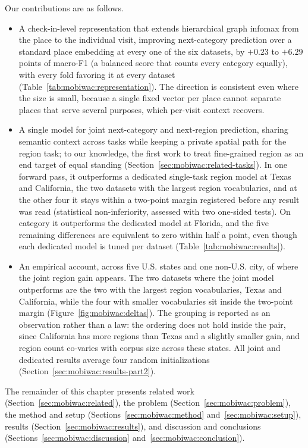 Our contributions are as follows.
\begin{itemize}
  \item A check-in-level representation that extends hierarchical graph infomax from the place to the individual visit, improving next-category prediction over a standard place embedding at every one of the six datasets, by $+0.23$ to $+6.29$ points of macro-F1 (a balanced score that counts every
    category equally), with every fold favoring it at every dataset (Table~\ref{tab:mobiwac:representation}). The direction is
    consistent even where the size is small, because a single fixed vector
    per place cannot separate places that serve several purposes, which
    per-visit context recovers.
  \item A single model for joint next-category and next-region prediction, sharing semantic context across tasks while keeping a private spatial path for the region task; to our knowledge, the first work to treat fine-grained region as an end target of equal standing (Section~\ref{sec:mobiwac:related-tasks}). In one forward pass, it outperforms a dedicated
    single-task region model at Texas and California, the two datasets with the
    largest region vocabularies, and at the other four it stays within a
    two-point margin registered before any result was read (statistical
    non-inferiority, assessed with two one-sided tests). On category it
    outperforms the dedicated model at Florida, and the five remaining
    differences are equivalent to zero within half a point, even though each
    dedicated model is tuned per dataset (Table~\ref{tab:mobiwac:results}).
  \item An empirical account, across five U.S. states and one non-U.S. city, of where the joint
    region gain appears. The two datasets where the joint model outperforms are the two with the
    largest region vocabularies, Texas and California, while the four with smaller vocabularies sit
    inside the two-point margin (Figure~\ref{fig:mobiwac:deltas}). The grouping is reported as an
    observation rather than a law: the ordering does not hold inside the pair, since California has
    more regions than Texas and a slightly smaller gain, and region count co-varies with corpus
    size across these states. All joint and dedicated results average
    four random initializations (Section~\ref{sec:mobiwac:results-part2}).
\end{itemize}

The remainder of this chapter presents related work (Section~\ref{sec:mobiwac:related}), the problem (Section~\ref{sec:mobiwac:problem}), the method and setup (Sections~\ref{sec:mobiwac:method} and~\ref{sec:mobiwac:setup}), results (Section~\ref{sec:mobiwac:results}), and discussion and conclusions (Sections~\ref{sec:mobiwac:discussion} and~\ref{sec:mobiwac:conclusion}).
